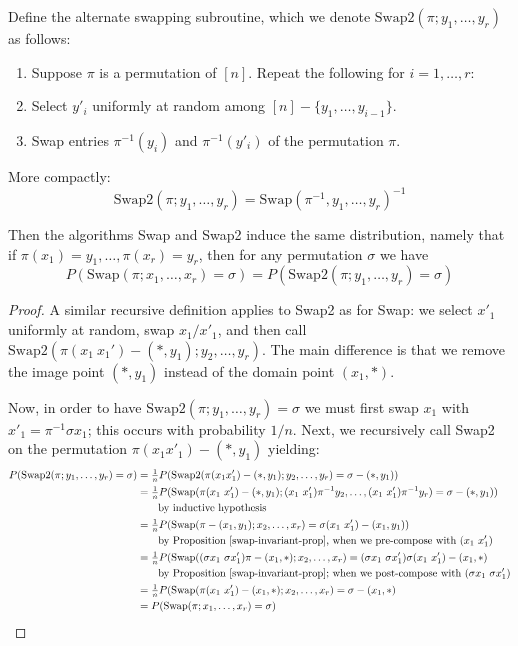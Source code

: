 \begin{proposition}
\label{exchange-sym-prop}
Define the alternate swapping subroutine, which we denote $\text{Swap2}(\pi; y_1, \dots, y_r)$ as follows: 
\begin{enumerate}
\item Suppose $\pi$ is a permutation of $[n]$. Repeat the following for $i = 1, \dots, r$:
\item Select $y'_i$ uniformly at random among $[n] - \{y_1, \dots, y_{i-1} \}$. 
\item Swap entries $\pi^{-1}(y_i)$ and $\pi^{-1} (y'_i)$ of the permutation $\pi$.
\end{enumerate}

More compactly:
$$
\text{Swap2}(\pi; y_1, \dots, y_r) = \text{Swap}(\pi^{-1}, y_1, \dots, y_r)^{-1}
$$

Then the algorithms Swap and Swap2 induce the same distribution, namely that if $\pi(x_1) = y_1, \dots, \pi(x_r) = y_r$, then for any permutation $\sigma$ we have
$$
P(\text{Swap}(\pi; x_1, \dots, x_r) = \sigma) = P(\text{Swap2}(\pi; y_1, \dots, y_r) = \sigma)
$$
\end{proposition}
\begin{proof}
A similar recursive definition applies to Swap2 as for Swap: we select $x'_1$ uniformly at random, swap $x_1/x'_1$, and then call $\text{Swap2}(\pi(x_1 \  x_1') - (*, y_1); y_2, \dots, y_r)$. The main difference is that we remove the image point $(*,y_1)$ instead of the domain point $(x_1, *)$.


Now, in order to have $\text{Swap2}(\pi; y_1, \dots, y_r) = \sigma$ we must first swap $x_1$ with $x'_1 = \pi^{-1} \sigma x_1 $; this occurs with probability $1/n$. Next, we recursively call Swap2 on the permutation $\pi (x_1 x'_1) - (*, y_1)$ yielding:
\begin{align*}
P(\text{Swap2}(\pi; y_1, \dots, y_r) = \sigma) &= \tfrac{1}{n} P(\text{Swap2}(\pi (x_1 x'_1) - (*, y_1); y_2, \dots, y_r) = \sigma - (*, y_1) ) \\
&= \tfrac{1}{n} P(\text{Swap}(\pi (x_1 \  x'_1) - (*, y_1); (x_1  \ x'_1) \pi^{-1} y_2, \dots,(x_1  \ x'_1) \pi^{-1} y_r) = \sigma - (*, y_1) ) \\
& \qquad \text{by inductive hypothesis} \\
&= \tfrac{1}{n} P(\text{Swap}(\pi - (x_1, y_1);  x_2, \dots, x_r) = \sigma (x_1 \ x_1')- (x_1, y_1) ) \\
& \qquad \text{by Proposition~\ref{swap-invariant-prop}, when we pre-compose with $(x_1 \ x_1')$} \\
&= \tfrac{1}{n} P(\text{Swap}((\sigma x_1 \ \sigma x'_1) \pi - (x_1, *);  x_2, \dots, x_r) = (\sigma x_1 \ \sigma x'_1) \sigma (x_1 \ x_1')- (x_1,* ) \\
& \qquad \text{by Proposition~\ref{swap-invariant-prop}; when we post-compose with $(\sigma x_1 \ \sigma x'_1)$} \\
&= \tfrac{1}{n} P(\text{Swap}(\pi (x_1 \ x'_1) - (x_1, *);  x_2, \dots, x_r) = \sigma- (x_1, *) \\
&= P(\text{Swap}(\pi; x_1, \dots, x_r) = \sigma)
\end{align*}
\end{proof}



